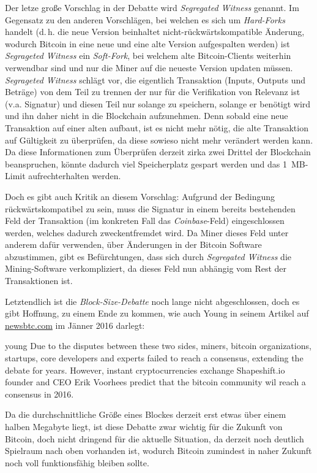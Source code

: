 Der letze große Vorschlag in der Debatte wird \emph{Segregated Witness} genannt.
Im Gegensatz zu den anderen Vorschlägen, bei welchen es sich um \emph{Hard-Forks} handelt (d.\,h. die neue Version beinhaltet nicht-rückwärtskompatible Änderung, wodurch Bitcoin in eine neue und eine alte Version aufgespalten werden) ist \emph{Segrageted Witness} ein \emph{Soft-Fork}, bei welchem alte Bitcoin-Clients weiterhin verwendbar sind und nur die Miner auf die neueste Version updaten müssen.
\emph{Segrageted Witness} schlägt vor, die eigentlich Transaktion (Inputs, Outputs und Beträge) von dem Teil zu trennen der nur für die Verifikation von Relevanz ist (v.a. Signatur) und diesen Teil nur solange zu speichern, solange er benötigt wird und ihn daher nicht in die Blockchain aufzunehmen.
Denn sobald eine neue Transaktion auf einer alten aufbaut, ist es nicht mehr nötig, die alte Transaktion auf Gültigkeit zu überprüfen, da diese sowieso nicht mehr verändert werden kann.
Da diese Informationen zum Überprüfen derzeit zirka zwei Drittel der Blockchain beanspruchen, könnte dadurch viel Speicherplatz gespart werden und das 1~MB-Limit aufrechterhalten werden.

Doch es gibt auch Kritik an diesem Vorschlag:
Aufgrund der Bedingung rückwärtskompatibel zu sein, muss die Signatur in einem bereits bestehenden Feld der Transaktion (im konkreten Fall das \emph{Coinbase}-Feld) eingeschlossen werden, welches dadurch zweckentfremdet wird.
Da Miner dieses Feld unter anderem dafür verwenden, über Änderungen in der Bitcoin Software abzustimmen, gibt es Befürchtungen, dass sich durch \emph{Segregated Witness} die Mining-Software verkompliziert, da dieses Feld nun abhängig vom Rest der Transaktionen ist.

Letztendlich ist die \emph{Block-Size-Debatte} noch lange nicht abgeschlossen, doch es gibt Hoffnung, zu einem Ende zu kommen, wie auch Young in seinem Artikel auf \url{newsbtc.com} im Jänner 2016 darlegt:

\begin{longquote}{young}
Due to the disputes between these two sides, miners, bitcoin organizations, startups, core developers and experts failed to reach a consensus, extending the debate for years.
However, instant cryptocurrencies exchange Shapeshift.io founder and CEO Erik Voorhees predict that the bitcoin community wil reach a consensus in 2016.
\end{longquote}

Da die durchschnittliche Größe eines Blockes derzeit erst etwas über einem halben Megabyte liegt, ist diese Debatte zwar wichtig für die Zukunft von Bitcoin, doch nicht dringend für die aktuelle Situation, da derzeit noch deutlich Spielraum nach oben vorhanden ist, wodurch Bitcoin zumindest in naher Zukunft noch voll funktionsfähig bleiben sollte.
